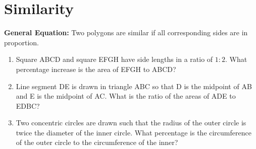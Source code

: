 \section{Similarity}

\textbf{General Equation:} Two polygons are similar if all corresponding sides are in proportion.

\vfill
\begin{enumerate}[labelindent=*,style=multiline,leftmargin=*,label=\textbf{Example \arabic*:}]
\item Square ABCD and square EFGH have side lengths in a ratio of $1:2$. What percentage increase is the area of EFGH to ABCD?

\vfill\item Line segment DE is drawn in triangle ABC so that D is the midpoint of AB and E is the midpoint of AC. What is the ratio of the areas of ADE to EDBC?

\vfill\item Two concentric circles are drawn such that the radius of the outer circle is twice the diameter of the inner circle. What percentage is the circumference of the outer circle to the circumference of the inner?
\end{enumerate}

